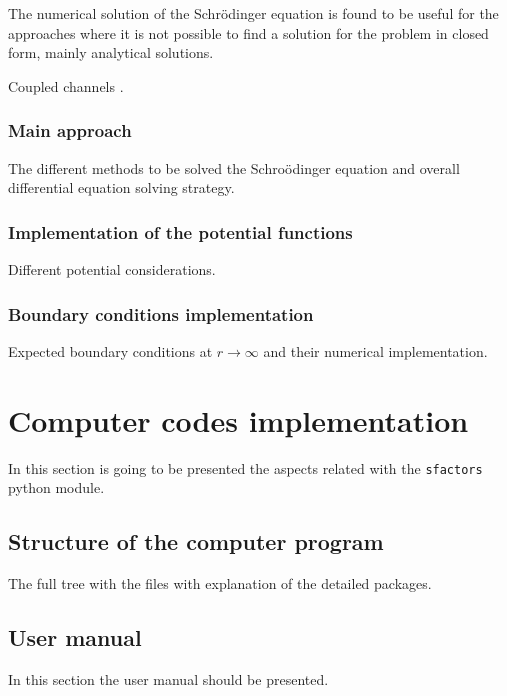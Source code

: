 \documentclass[openany]{book}
\begin{document}
The numerical solution of the Schrödinger equation is found to be useful for the approaches where it is not possible to find a solution for the problem in closed form, mainly analytical solutions. 

\cite{salvat_fernandez-varea_2019}

Coupled channels \cite{hagino_rowley_kruppa_1999}.

\subsection{Main approach}

The different methods to be solved the Schroödinger equation and overall differential equation solving strategy. 

\subsection{Implementation of the potential functions}

Different potential considerations. 

\subsection{Boundary conditions implementation}

Expected boundary conditions at $r \rightarrow \infty$ and their numerical implementation.

\chapter{Computer codes implementation} \label{ap:codes}

In this section is going to be presented the aspects related with the \texttt{sfactors} python module. 

\section{Structure of the computer program} \label{sec:programStructure}

The full tree with the files with explanation of the detailed packages.

\section{User manual} \label{sec:userManual}

In this section the user manual should be presented.
\end{document}

